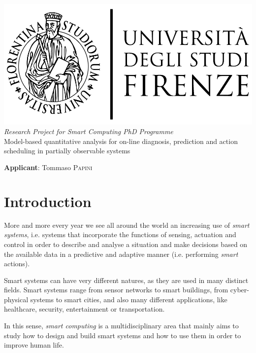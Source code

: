 \documentclass{article}
\begin{document}
    
    \begin{center}
        \includegraphics[scale=0.2]{logo_unifi.jpg}\\[4cm]
        \textit{Research Project for Smart Computing PhD Programme}\\[0.3cm]
        {\Huge Model-based quantitative analysis for on-line diagnosis, prediction and action scheduling in partially observable systems}
    \end{center}
    
    \vfill
    
    \textbf{Applicant}: Tommaso \textsc{Papini}
    
    \clearpage
    
    \section*{Introduction}
    
        More and more every year we see all around the world an increasing use of \textit{smart systems}, i.e. systems that incorporate the functions of sensing, actuation and control in order to describe and analyse a situation and make decisions based on the available data in a predictive and adaptive manner (i.e. performing \textit{smart} actions).
        
        Smart systems can have very different natures, as they are used in many distinct fields. Smart systems range from sensor networks to smart buildings, from cyber-physical systems to smart cities, and also many different applications, like healthcare, security, entertainment or transportation.
        
        In this sense, \textit{smart computing} is a multidisciplinary area that mainly aims to study how to design and build smart systems and how to use them in order to improve human life.
        
\end{document}
